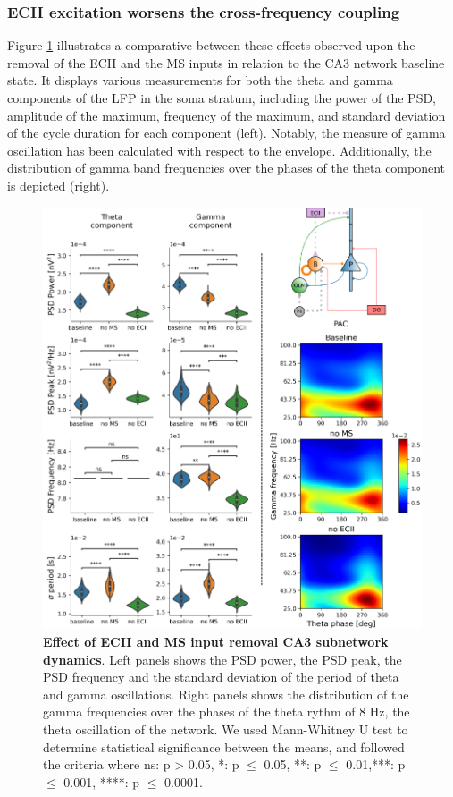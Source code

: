 \documentclass[../main.tex]{subfiles}
\begin{document}
\subsubsection{ECII excitation worsens the cross-frequency coupling}
Figure \ref{fig:no-ec2-input-ca3} illustrates a comparative between these effects observed upon the removal of the ECII and the MS inputs in relation to the CA3 network baseline state.
It displays various measurements for both the theta and gamma components of the LFP in the soma stratum, including the power of the PSD, amplitude of the maximum, frequency of the maximum, and standard deviation of the cycle duration for each component (left). 
Notably, the measure of gamma oscillation has been calculated with respect to the envelope. 
Additionally, the distribution of gamma band frequencies over the phases of the theta component is depicted (right).
\begin{figure}[!htb]
    \centering
    \includegraphics[width=\textwidth]{chapter4/figures/no_ec2_ms_inputs_ca3.png}
    \caption{\textbf{Effect of ECII and MS input removal  CA3 subnetwork dynamics}.
    Left panels shows the PSD power, the PSD peak, the PSD frequency and the standard deviation of the period of theta and gamma oscillations.
    Right panels shows the distribution of the gamma frequencies over the phases of the theta rythm of 8 Hz, the theta oscillation of the network.
    We used Mann-Whitney U test to determine statistical significance between the means, and followed the criteria where ns: p > 0.05, *: p $\leq$ 0.05, **: p $\leq$ 0.01,***: p $\leq$ 0.001, ****: p $\leq$ 0.0001.}
    \label{fig:no-ec2-input-ca3}
\end{figure}
\end{document}
